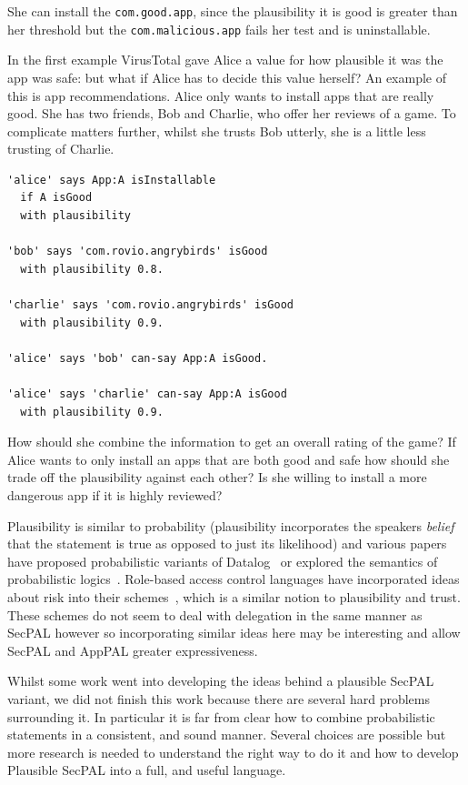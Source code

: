 \documentclass[thesis.tex]{subfiles}
\begin{document}
She can install the \texttt{com.good.app}, since the plausibility it is good is
greater than her threshold but the \texttt{com.malicious.app} fails her test and
is uninstallable. 

In the first example VirusTotal gave Alice a value for how plausible it was the
app was safe: but what if Alice has to decide this value herself? An example of
this is app recommendations. Alice only wants to install apps that are really
good. She has two friends, Bob and Charlie, who offer her reviews of a game. To
complicate matters further, whilst she trusts Bob utterly, she is a little less
trusting of Charlie.

\begin{lstlisting}
'alice' says App:A isInstallable
  if A isGood
  with plausibility

'bob' says 'com.rovio.angrybirds' isGood
  with plausibility 0.8.

'charlie' says 'com.rovio.angrybirds' isGood
  with plausibility 0.9.

'alice' says 'bob' can-say App:A isGood.

'alice' says 'charlie' can-say App:A isGood
  with plausibility 0.9.
\end{lstlisting}

How should she combine the information to get an overall rating of the game? If
Alice wants to only install an apps that are both good and safe how should she
trade off the plausibility against each other? Is she willing to install a more
dangerous app if it is highly reviewed?

Plausibility is similar to probability (plausibility incorporates the speakers
\emph{belief} that the statement is true as opposed to just its likelihood) and
various papers have proposed probabilistic variants of
Datalog~\cite{fuhr_probabilistic_1995} or explored the semantics of
probabilistic logics~\cite{halpern_analysis_1990}. Role-based access control
languages have incorporated ideas about risk into their
schemes~\cite{josang_analysing_2004,dimmock_using_2004,salim_approach_2011},
which is a similar notion to plausibility and trust. These schemes do not seem
to deal with delegation in the same manner as SecPAL however so incorporating
similar ideas here may be interesting and allow SecPAL and AppPAL greater
expressiveness.

Whilst some work went into developing the ideas behind a plausible SecPAL
variant, we did not finish this work because there are several hard problems
surrounding it. In particular it is far from clear how to combine probabilistic
statements in a consistent, and sound manner. Several choices are possible but
more research is needed to understand the right way to do it and how to develop
Plausible SecPAL into a full, and useful language.
\end{document}
